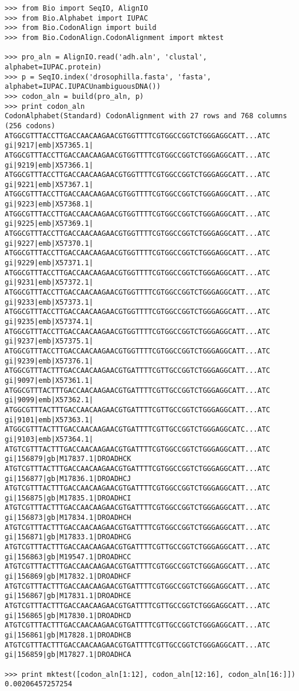 \begin{verbatim}
>>> from Bio import SeqIO, AlignIO
>>> from Bio.Alphabet import IUPAC
>>> from Bio.CodonAlign import build
>>> from Bio.CodonAlign.CodonAlignment import mktest

>>> pro_aln = AlignIO.read('adh.aln', 'clustal', alphabet=IUPAC.protein)
>>> p = SeqIO.index('drosophilla.fasta', 'fasta', alphabet=IUPAC.IUPACUnambiguousDNA())
>>> codon_aln = build(pro_aln, p)
>>> print codon_aln
CodonAlphabet(Standard) CodonAlignment with 27 rows and 768 columns (256 codons)
ATGGCGTTTACCTTGACCAACAAGAACGTGGTTTTCGTGGCCGGTCTGGGAGGCATT...ATC gi|9217|emb|X57365.1|
ATGGCGTTTACCTTGACCAACAAGAACGTGGTTTTCGTGGCCGGTCTGGGAGGCATT...ATC gi|9219|emb|X57366.1|
ATGGCGTTTACCTTGACCAACAAGAACGTGGTTTTCGTGGCCGGTCTGGGAGGCATT...ATC gi|9221|emb|X57367.1|
ATGGCGTTTACCTTGACCAACAAGAACGTGGTTTTCGTGGCCGGTCTGGGAGGCATT...ATC gi|9223|emb|X57368.1|
ATGGCGTTTACCTTGACCAACAAGAACGTGGTTTTCGTGGCCGGTCTGGGAGGCATT...ATC gi|9225|emb|X57369.1|
ATGGCGTTTACCTTGACCAACAAGAACGTGGTTTTCGTGGCCGGTCTGGGAGGCATT...ATC gi|9227|emb|X57370.1|
ATGGCGTTTACCTTGACCAACAAGAACGTGGTTTTCGTGGCCGGTCTGGGAGGCATT...ATC gi|9229|emb|X57371.1|
ATGGCGTTTACCTTGACCAACAAGAACGTGGTTTTCGTGGCCGGTCTGGGAGGCATT...ATC gi|9231|emb|X57372.1|
ATGGCGTTTACCTTGACCAACAAGAACGTGGTTTTCGTGGCCGGTCTGGGAGGCATT...ATC gi|9233|emb|X57373.1|
ATGGCGTTTACCTTGACCAACAAGAACGTGGTTTTCGTGGCCGGTCTGGGAGGCATT...ATC gi|9235|emb|X57374.1|
ATGGCGTTTACCTTGACCAACAAGAACGTGGTTTTCGTGGCCGGTCTGGGAGGCATT...ATC gi|9237|emb|X57375.1|
ATGGCGTTTACCTTGACCAACAAGAACGTGGTTTTCGTGGCCGGTCTGGGAGGCATT...ATC gi|9239|emb|X57376.1|
ATGGCGTTTACTTTGACCAACAAGAACGTGATTTTCGTTGCCGGTCTGGGAGGCATT...ATC gi|9097|emb|X57361.1|
ATGGCGTTTACTTTGACCAACAAGAACGTGATTTTCGTTGCCGGTCTGGGAGGCATT...ATC gi|9099|emb|X57362.1|
ATGGCGTTTACTTTGACCAACAAGAACGTGATTTTCGTTGCCGGTCTGGGAGGCATT...ATC gi|9101|emb|X57363.1|
ATGGCGTTTACTTTGACCAACAAGAACGTGATTTTCGTTGCCGGTCTGGGAGGCATC...ATC gi|9103|emb|X57364.1|
ATGTCGTTTACTTTGACCAACAAGAACGTGATTTTCGTGGCCGGTCTGGGAGGCATT...ATC gi|156879|gb|M17837.1|DROADHCK
ATGTCGTTTACTTTGACCAACAAGAACGTGATTTTCGTGGCCGGTCTGGGAGGCATT...ATC gi|156877|gb|M17836.1|DROADHCJ
ATGTCGTTTACTTTGACCAACAAGAACGTGATTTTCGTGGCCGGTCTGGGAGGCATT...ATC gi|156875|gb|M17835.1|DROADHCI
ATGTCGTTTACTTTGACCAACAAGAACGTGATTTTCGTGGCCGGTCTGGGAGGCATT...ATC gi|156873|gb|M17834.1|DROADHCH
ATGTCGTTTACTTTGACCAACAAGAACGTGATTTTCGTGGCCGGTCTGGGAGGCATT...ATC gi|156871|gb|M17833.1|DROADHCG
ATGTCGTTTACTTTGACCAACAAGAACGTGATTTTCGTTGCCGGTCTGGGAGGCATT...ATC gi|156863|gb|M19547.1|DROADHCC
ATGTCGTTTACTTTGACCAACAAGAACGTGATTTTCGTGGCCGGTCTGGGAGGCATT...ATC gi|156869|gb|M17832.1|DROADHCF
ATGTCGTTTACTTTGACCAACAAGAACGTGATTTTCGTGGCCGGTCTGGGAGGCATT...ATC gi|156867|gb|M17831.1|DROADHCE
ATGTCGTTTACTTTGACCAACAAGAACGTGATTTTCGTTGCCGGTCTGGGAGGCATT...ATC gi|156865|gb|M17830.1|DROADHCD
ATGTCGTTTACTTTGACCAACAAGAACGTGATTTTCGTTGCCGGTCTGGGAGGCATT...ATC gi|156861|gb|M17828.1|DROADHCB
ATGTCGTTTACTTTGACCAACAAGAACGTGATTTTCGTTGCCGGTCTGGGAGGCATT...ATC gi|156859|gb|M17827.1|DROADHCA

>>> print mktest([codon_aln[1:12], codon_aln[12:16], codon_aln[16:]])
0.00206457257254
\end{verbatim}

